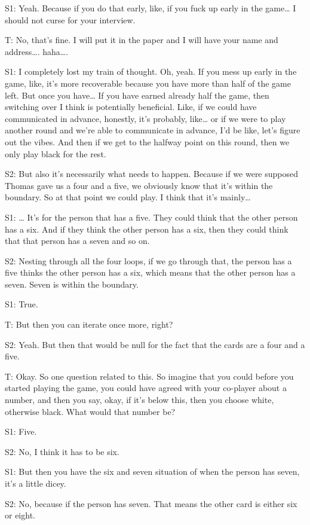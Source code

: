 S1: Yeah. Because if you do that early, like, if you fuck up early in the game… I should not curse for your interview.

T: No, that's fine. I will put it in the paper and I will have your name and address…. haha…. 

S1: I completely lost my train of thought. Oh, yeah. If you mess up early in the game, like, it's more recoverable because you have more than half of the game left. But once you have… If you have earned already half the game, then switching over I think is potentially beneficial. Like, if we could have communicated in advance, honestly, it's probably, like… or if we were to play another round and we're able to communicate in advance, I'd be like, let's figure out the vibes. And then if we get to the halfway point on this round, then we only play black for the rest.

S2: But also it's necessarily what needs to happen. Because if we were supposed Thomas gave us a four and a five, we obviously know that it's within the boundary. So at that point we could play. I think that it’s mainly…

S1: … It’s for the person that has a five. They could think that the other person has a six. And if they think the other person has a six, then they could think that that person has a seven and so on. 

S2: Nesting through all the four loops, if we go through that, the person has a five thinks the other person has a six, which means that the other person has a seven. Seven is within the boundary. 

S1: True. 

T: But then you can iterate once more, right? 

S2: Yeah. But then that would be null for the fact that the cards are a four and a five. 

T: Okay. So one question related to this. So imagine that you could before you started playing the game, you could have agreed with your co-player about a number, and then you say, okay, if it's below this, then you choose white, otherwise black. What would that number be? 

S1: Five. 

S2: No, I think it has to be six.

S1: But then you have the six and seven situation of when the person has seven, it's a little dicey.

S2: No, because if the person has seven. That means the other card is either six or eight. 

